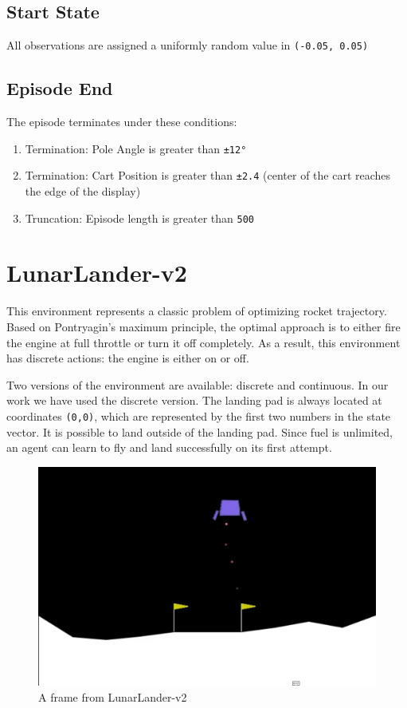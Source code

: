 \documentclass{article} %
\begin{document}
\subsection{Start State}
All observations are assigned a uniformly random value in \verb|(-0.05, 0.05)|

\subsection{Episode End}
The episode terminates under these conditions:

\begin{enumerate}
    \item Termination: Pole Angle is greater than \verb|±12°|
    \item Termination: Cart Position is greater than \verb|±2.4| (center of the cart
    reaches the edge of the display)
    \item Truncation: Episode length is greater than \verb|500|
\end{enumerate}


\section{LunarLander-v2}

This environment represents a classic problem of optimizing rocket trajectory. Based on Pontryagin’s maximum principle, the optimal approach is to either fire the engine at full throttle or turn it off completely. As a result, this environment has discrete actions: the engine is either on or off.

Two versions of the environment are available: discrete and continuous. In our work we have used the discrete version. The landing pad is always located at coordinates \verb|(0,0)|, which are represented by the first two numbers in the state vector. It is possible to land outside of the landing pad. Since fuel is unlimited, an agent can learn to fly and land successfully on its first attempt.

\begin{figure}[h]
    \begin{center}
        \includegraphics[width=\textwidth]{lunar_lander.png}
    \end{center}
    \caption{A frame from LunarLander-v2}
    \label{fig:mcar-rendering}
\end{figure}
\end{document}
